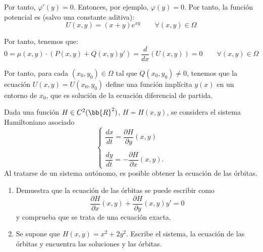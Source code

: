 \begin{ejercicio}
    Por tanto, $\varphi'(y)=0$. Entonces, por ejemplo, $\varphi(y)=0$. Por tanto, la función potencial es (salvo una constante aditiva):
    \begin{equation*}
        U(x,y)=(x+y)e^{xy}\qquad \forall (x,y)\in\Omega
    \end{equation*}

    Por tanto, tenemos que:
    \begin{equation*}
        0=\mu(x,y)\cdot (P(x,y)+Q(x,y)y')=\dfrac{d}{dx}\left(U(x,y)\right)=0\qquad \forall (x,y)\in\Omega
    \end{equation*}

    Por tanto, para cada $(x_0, y_0)\in \Omega$ tal que $Q(x_0,y_0)\neq 0$, tenemos que la ecuación $U(x,y)=U(x_0,y_0)$ define una función implícita $y(x)$ en un entorno de $x_0$, que es solución de la ecuación diferencial de partida.
\end{ejercicio}

\begin{ejercicio}
    Dada una función $H \in C^2(\bb{R}^2)$, $H = H(x, y)$, se considera el sistema Hamiltoniano asociado
    \[
        \begin{cases}
            \dfrac{dx}{dt} = \dfrac{\partial H}{\partial y}(x, y) \\ \\
            \dfrac{dy}{dt} = -\dfrac{\partial H}{\partial x}(x, y).
        \end{cases}
    \]
    Al tratarse de un sistema autónomo, es posible obtener la ecuación de las órbitas.
    \begin{enumerate}
        \item Demuestra que la ecuación de las órbitas se puede escribir como
        \[
            \frac{\partial H}{\partial x}(x, y) + \frac{\partial H}{\partial y}(x, y)y' = 0
        \]
        y comprueba que se trata de una ecuación exacta.
        \item Se supone que $H(x, y) = x^2 + 2y^2$. Escribe el sistema, la ecuación de las órbitas y encuentra las soluciones y
        las órbitas.
    \end{enumerate}
\end{ejercicio}

